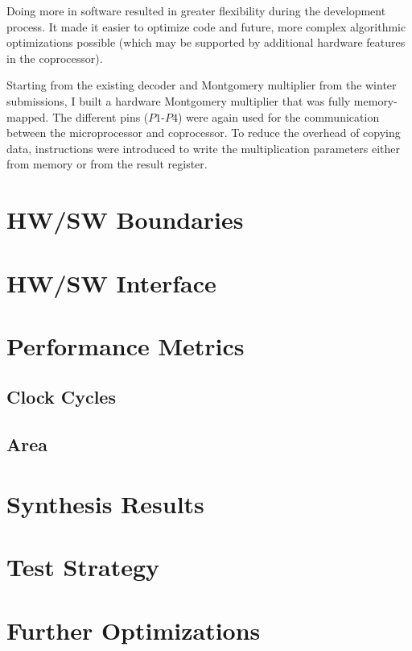 \documentclass[a4paper]{article}
\begin{document}
Doing more in software resulted in greater flexibility during the development process. It made it easier to optimize  code and  future, more complex algorithmic optimizations possible (which may be supported by additional hardware features in the coprocessor).

Starting from the existing decoder and Montgomery multiplier from the winter submissions, I built a hardware Montgomery multiplier that was fully memory-mapped. The different pins ($P1$-$P4$) were again used for the communication between the microprocessor and coprocessor. To reduce the overhead of copying data, instructions were introduced to write the multiplication parameters either from memory or from the result register.

\section{HW/SW Boundaries}

\section{HW/SW Interface}

\section{Performance Metrics}

\subsection{Clock Cycles}

\subsection{Area}

\section{Synthesis Results}

\section{Test Strategy}

\section{Further Optimizations}
\end{document}
